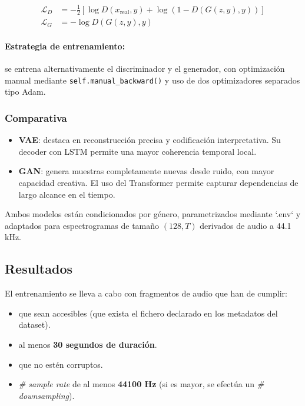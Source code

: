 \begin{align*}
\mathcal{L}_D &= -\frac{1}{2} \left[ \log D(x_{\text{real}}, y) + \log(1 - D(G(z, y), y)) \right] \\
\mathcal{L}_G &= -\log D(G(z, y), y)
\end{align*}

\paragraph{Estrategia de entrenamiento:} se entrena alternativamente el discriminador y el generador, con optimización manual mediante \texttt{self.manual\_backward()} y uso de dos optimizadores separados tipo Adam.

\vspace{1em}

\subsubsection*{Comparativa}

\begin{itemize}
    \item \textbf{VAE}: destaca en reconstrucción precisa y codificación interpretativa. Su decoder con LSTM permite una mayor coherencia temporal local.
    \item \textbf{GAN}: genera muestras completamente nuevas desde ruido, con mayor capacidad creativa. El uso del Transformer permite capturar dependencias de largo alcance en el tiempo.
\end{itemize}

Ambos modelos están condicionados por género, parametrizados mediante `.env` y adaptados para espectrogramas de tamaño $(128, T)$ derivados de audio a 44.1 kHz.

\subsection{Resultados}

El entrenamiento se lleva a cabo con fragmentos de audio que han de cumplir:
\begin{itemize}
    \item que sean accesibles (que exista el fichero declarado en los metadatos del dataset).
    \item al menos \textbf{30 segundos de duración}.
    \item que no estén corruptos.
    \item \emph{\# sample rate} de al menos \textbf{44100 Hz} (si es mayor, se efectúa un \emph{\# downsampling}).
\end{itemize}

